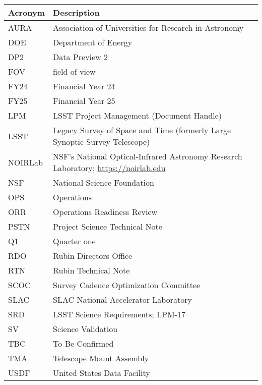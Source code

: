 \addtocounter{table}{-1}
\begin{longtable}{p{}p{}}\hline
\textbf{Acronym} & \textbf{Description}  \\\hline

AURA & Association of Universities for Research in Astronomy \\\hline
DOE & Department of Energy \\\hline
DP2 & Data Preview 2 \\\hline
FOV & field of view \\\hline
FY24 & Financial Year 24 \\\hline
FY25 & Financial Year 25 \\\hline
LPM & LSST Project Management (Document Handle) \\\hline
LSST & Legacy Survey of Space and Time (formerly Large Synoptic Survey Telescope) \\\hline
NOIRLab & NSF's National Optical-Infrared Astronomy Research Laboratory; \url{https://noirlab.edu} \\\hline
NSF & National Science Foundation \\\hline
OPS & Operations \\\hline
ORR & Operations Readiness Review \\\hline
PSTN & Project Science Technical Note \\\hline
Q1 & Quarter one \\\hline
RDO & Rubin Directors Office \\\hline
RTN & Rubin Technical Note \\\hline
SCOC & Survey Cadence Optimization Committee \\\hline
SLAC & SLAC National Accelerator Laboratory \\\hline
SRD & LSST Science Requirements; LPM-17 \\\hline
SV & Science Validation \\\hline
TBC & To Be Confirmed \\\hline
TMA & Telescope Mount Assembly \\\hline
USDF & United States Data Facility \\\hline
\end{longtable}
